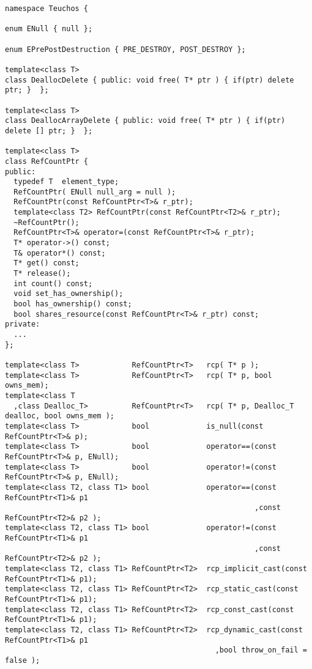 \documentclass[pdf,ps2pdf,11pt]{SANDreport}
\begin{document}
{\scriptsize\begin{verbatim}
namespace Teuchos {

enum ENull { null };

enum EPrePostDestruction { PRE_DESTROY, POST_DESTROY };

template<class T>
class DeallocDelete { public: void free( T* ptr ) { if(ptr) delete ptr; }  };

template<class T>
class DeallocArrayDelete { public: void free( T* ptr ) { if(ptr) delete [] ptr; }  };

template<class T>
class RefCountPtr {
public:
  typedef T  element_type;
  RefCountPtr( ENull null_arg = null );
  RefCountPtr(const RefCountPtr<T>& r_ptr);
  template<class T2> RefCountPtr(const RefCountPtr<T2>& r_ptr);
  ~RefCountPtr();
  RefCountPtr<T>& operator=(const RefCountPtr<T>& r_ptr);
  T* operator->() const;
  T& operator*() const;
  T* get() const;
  T* release();
  int count() const;
  void set_has_ownership();
  bool has_ownership() const;
  bool shares_resource(const RefCountPtr<T>& r_ptr) const;
private:
  ...
};

template<class T>            RefCountPtr<T>   rcp( T* p );
template<class T>            RefCountPtr<T>   rcp( T* p, bool owns_mem);
template<class T
  ,class Dealloc_T>          RefCountPtr<T>   rcp( T* p, Dealloc_T dealloc, bool owns_mem );
template<class T>            bool             is_null(const RefCountPtr<T>& p);
template<class T>            bool             operator==(const RefCountPtr<T>& p, ENull);
template<class T>            bool             operator!=(const RefCountPtr<T>& p, ENull);
template<class T2, class T1> bool             operator==(const RefCountPtr<T1>& p1
                                                         ,const RefCountPtr<T2>& p2 );
template<class T2, class T1> bool             operator!=(const RefCountPtr<T1>& p1
                                                         ,const RefCountPtr<T2>& p2 );
template<class T2, class T1> RefCountPtr<T2>  rcp_implicit_cast(const RefCountPtr<T1>& p1);
template<class T2, class T1> RefCountPtr<T2>  rcp_static_cast(const RefCountPtr<T1>& p1);
template<class T2, class T1> RefCountPtr<T2>  rcp_const_cast(const RefCountPtr<T1>& p1);
template<class T2, class T1> RefCountPtr<T2>  rcp_dynamic_cast(const RefCountPtr<T1>& p1
                                                ,bool throw_on_fail = false );
\end{verbatim}}
\pagebreak
\end{document}
